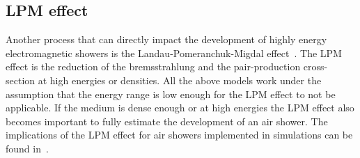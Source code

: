 \subsection{LPM effect}
\label{subsec:LPM}
Another process that can directly impact the development of highly energy electromagnetic showers is the Landau-Pomeranchuk-Migdal effect~\cite{Landau:1953um,PhysRev.103.1811}. The LPM effect is the reduction of the bremsstrahlung and the pair-production cross-section at high energies or densities. All the above models work under the assumption that the energy range is low enough for the LPM effect to not be applicable. If the medium is dense enough or at high energies the LPM effect also becomes important to fully estimate the development of an air shower. The implications of the LPM effect for air showers implemented in simulations can be found in~\cite{sandrock2023validationelectromagneticshowerscorsika}. 

